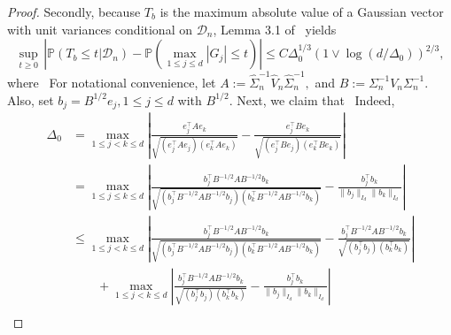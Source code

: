 \documentclass{article}
\begin{document}
\begin{appendices}
\begin{proof}
 Secondly, because $T_b$ is the maximum absolute value of a Gaussian vector with unit variances conditional on $\mathcal{D}_n$, Lemma 3.1 of~\cite{Cher13} yields
 \begin{equation}\label{eq:Gaussian-comparison-bound}
 \sup_{t\ge 0}\,\left|\mathbb{P}(T_b \le t\big|\mathcal{D}_n) - \mathbb{P}\left(\max_{1\le j\le d}|G_j| \le t\right)\right| \le C\Delta_0^{1/3}(1\vee \log(d/\Delta_0))^{2/3},
 \end{equation}
 where
 \
 For notational convenience, let
 $A := \widehat{\Sigma}_n^{-1}\widehat{V}_n\widehat{\Sigma}_n^{-1},$ and $B := \Sigma_n^{-1}V_n\Sigma_n^{-1}.$
 Also, set $b_j = B^{1/2}e_j, 1\le j\le d$ with $B^{1/2}$. 
 Next, we claim that 
 \
 Indeed,
 \begin{align*}
 \Delta_0 
 &= \max_{1\le j < k\le d}\left|\frac{e_j^{\top}Ae_k}{\sqrt{(e_j^{\top}Ae_j)(e_k^{\top}Ae_k)}} - \frac{e_j^{\top}Be_k}{\sqrt{(e_j^{\top}Be_j)(e_k^{\top}Be_k)}}\right|\\
 &= \max_{1\le j\le k \le d}\left|\frac{b_j^{\top}B^{-1/2}AB^{-1/2}b_k}{\sqrt{(b_j^{\top}B^{-1/2}AB^{-1/2}b_j)(b_k^{\top}B^{-1/2}AB^{-1/2}b_k)}} - \frac{b_j^{\top}b_k}{\|b_j\|_{I_d}\|b_k\|_{I_d}}\right|\\
 &\le \max_{1\le j < k\le d}\left|\frac{b_j^{\top}B^{-1/2}AB^{-1/2}b_k}{\sqrt{(b_j^{\top}B^{-1/2}AB^{-1/2}b_j)(b_k^{\top}B^{-1/2}AB^{-1/2}b_k)}} - \frac{b_j^{\top}B^{-1/2}AB^{-1/2}b_k}{\sqrt{(b_j^{\top}b_j)(b_k^{\top}b_k)}}\right|\\
 &\qquad+ \max_{1\le j < k\le d}\left|\frac{b_j^{\top}B^{-1/2}AB^{-1/2}b_k}{\sqrt{(b_j^{\top}b_j)(b_k^{\top}b_k)}} - \frac{b_j^{\top}b_k}{\|b_j\|_{I_d}\|b_k\|_{I_d}}\right|\\
 
 
 

\end{align*}
\end{proof}
\end{appendices}
\end{document}
